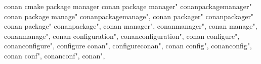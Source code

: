          
         conan cmake package manager
        conan package manager"
        conanpackagemanager" 
        conan package manage"
        conanpackagemanage",
        conan packager"
        conanpackager"
        conan package"
        conanpackage", 
        conan manager",
        conanmanager", 
        conan manage", 
        conanmanage",
        conan configuration", 
        conanconfiguration",
        conan configure",
        conanconfigure",
        configure conan",
        configureconan",
        conan config",
        conanconfig",
        conan conf",
        conanconf",
        conan",
